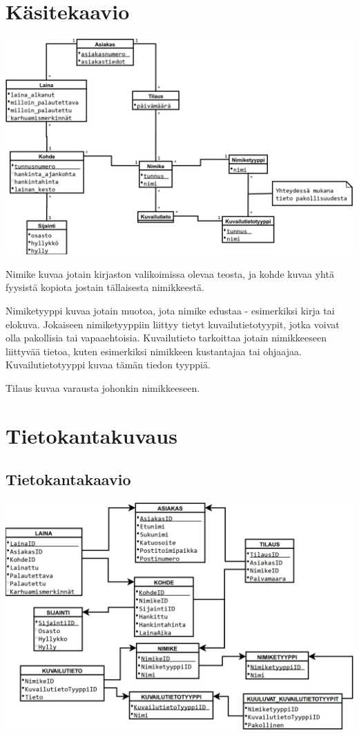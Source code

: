 \documentclass{article}
\let\stdsection\section
\renewcommand\section{\newpage\stdsection}
\begin{document}
\section{Käsitekaavio}

\includegraphics[width=\linewidth]{../kaaviot/kasitekaavio.pdf}

Nimike kuvaa jotain kirjaston valikoimissa olevaa teosta, ja kohde kuvaa yhtä fyysistä kopiota jostain tällaisesta nimikkeestä.

Nimiketyyppi kuvaa jotain muotoa, jota nimike edustaa - esimerkiksi kirja tai elokuva. Jokaiseen nimiketyyppiin liittyy tietyt kuvailutietotyypit, jotka voivat olla pakollisia tai vapaaehtoisia. Kuvailutieto tarkoittaa jotain nimikkeeseen liittyvää tietoa, kuten esimerkiksi nimikkeen kustantajaa tai ohjaajaa. Kuvailutietotyyppi kuvaa tämän tiedon tyyppiä.

Tilaus kuvaa varausta johonkin nimikkeeseen.

\section{Tietokantakuvaus}

\subsection{Tietokantakaavio}

\includegraphics[width=\linewidth]{../kaaviot/tietokantakaavio.pdf}
\end{document}
